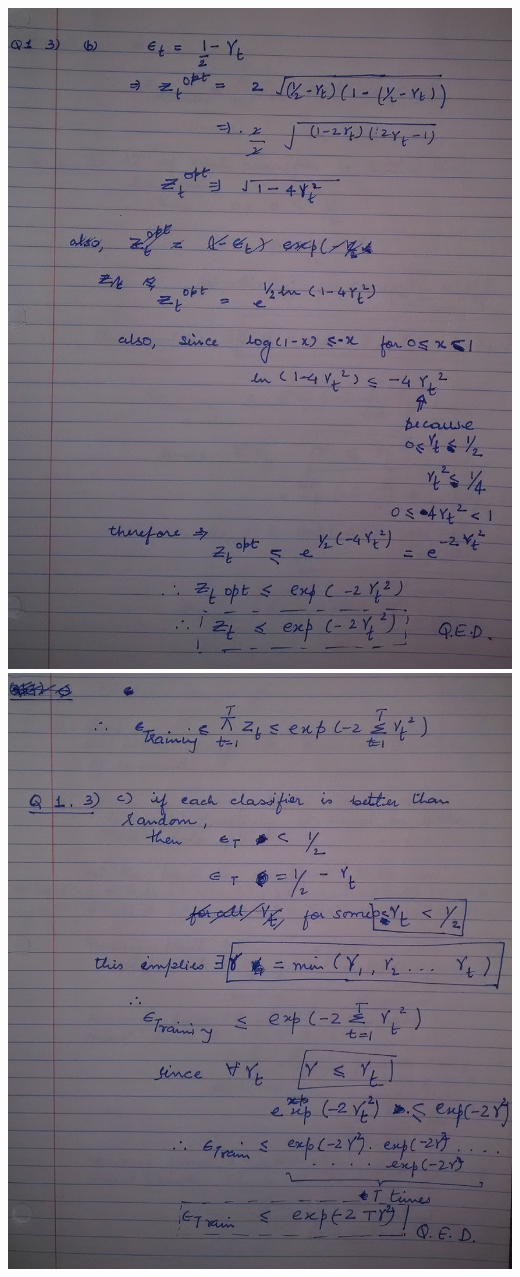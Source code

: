 \documentclass[letterpaper]{article}
\begin{document}
\includegraphics[width = 6in]{6.png}
\includegraphics[width = 6in]{7.png}
\end{document}

